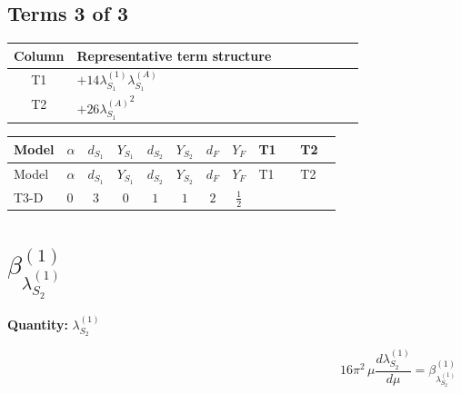 \documentclass[8pt]{article}
\begin{document}
\begin{landscape}
\subsection*{Terms 3 of 3}
\begin{center}
\begin{tabular}{@{}c >{\raggedright\arraybackslash}p{0.82\linewidth}@{}}
\toprule
Column & Representative term structure \\
\midrule
T1 & \(\displaystyle +14 {\lambda_{S_1}^{(1)}} {\lambda_{S_1}^{(A)}}\) \\
\midrule
T2 & \(\displaystyle +26 {\lambda_{S_1}^{(A)}}^2\) \\
\midrule
\bottomrule
\end{tabular}
\end{center}
\smallskip
\tiny
\begin{longtable}{@{}llcccccc >{\raggedright\arraybackslash}p{0.21\linewidth} >{\raggedright\arraybackslash}p{0.21\linewidth}@{}}
\toprule
Model & $\alpha$ & $d_{S_1}$ & $Y_{S_1}$ & $d_{S_2}$ & $Y_{S_2}$ & $d_F$ & $Y_F$ & T1 & T2 \\
\midrule
\endfirsthead
\toprule
Model & $\alpha$ & $d_{S_1}$ & $Y_{S_1}$ & $d_{S_2}$ & $Y_{S_2}$ & $d_F$ & $Y_F$ & T1 & T2 \\
\midrule
\endhead
T3-D & $0$ & $3$ & $0$ & $1$ & $1$ & $2$ & $\frac{1}{2}$ & \scriptsize\adjustbox{max width=\linewidth}{$\begin{gathered} +14 {\lambda_{S_1}^{(1)}} {\lambda_{S_1}^{(A)}}\end{gathered}$} & \scriptsize\adjustbox{max width=\linewidth}{$\begin{gathered} +26 {\lambda_{S_1}^{(A)}}^2\end{gathered}$} \\
\midrule
\bottomrule
\end{longtable}
\clearpage
\section*{$\beta_{\lambda_{S_2}^{(1)}}^{(1)}$}
\noindent\textbf{Quantity: }$\lambda_{S_2}^{(1)}$\par\smallskip
\[16\pi^2\,\mu\frac{d \lambda_{S_2}^{(1)}}{d\mu}=\beta_{\lambda_{S_2}^{(1)}}^{(1)}\]

\end{landscape}
\end{document}
